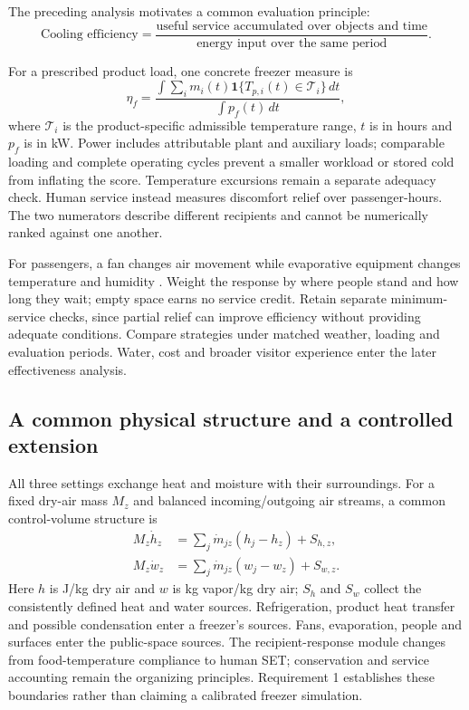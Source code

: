 \documentclass[12pt]{article}
\begin{document}
The preceding analysis motivates a common evaluation principle:
\begin{equation}
\boxed{\text{Cooling efficiency}
=\frac{\text{useful service accumulated over objects and time}}
{\text{energy input over the same period}}.}
\label{eq:principle}
\end{equation}

For a prescribed product load, one concrete freezer measure is
\begin{equation}
 \eta_f=\frac{\int\sum_i m_i(t)\mathbf{1}\{T_{p,i}(t)\in\mathcal T_i\}\,dt}
 {\int p_f(t)\,dt},
\label{eq:freezer-service}
\end{equation}
where $\mathcal T_i$ is the product-specific admissible temperature range, $t$ is in hours and $p_f$ is in kW. Power includes attributable plant and auxiliary loads; comparable loading and complete operating cycles prevent a smaller workload or stored cold from inflating the score. Temperature excursions remain a separate adequacy check. Human service instead measures discomfort relief over passenger-hours. The two numerators describe different recipients and cannot be numerically ranked against one another.

For passengers, a fan changes air movement while evaporative equipment changes temperature and humidity \cite{energystar,evap}. Weight the response by where people stand and how long they wait; empty space earns no service credit. Retain separate minimum-service checks, since partial relief can improve efficiency without providing adequate conditions. Compare strategies under matched weather, loading and evaluation periods. Water, cost and broader visitor experience enter the later effectiveness analysis.

\subsection{A common physical structure and a controlled extension}

All three settings exchange heat and moisture with their surroundings. For a fixed dry-air mass $M_z$ and balanced incoming/outgoing air streams, a common control-volume structure is
\begin{align}
 M_z\dot h_z&=\sum_j\dot m_{jz}(h_j-h_z)+S_{h,z},\\
 M_z\dot w_z&=\sum_j\dot m_{jz}(w_j-w_z)+S_{w,z}.
\label{eq:common-balance}
\end{align}
Here $h$ is J/kg dry air and $w$ is kg vapor/kg dry air; $S_h$ and $S_w$ collect the consistently defined heat and water sources. Refrigeration, product heat transfer and possible condensation enter a freezer's sources. Fans, evaporation, people and surfaces enter the public-space sources. The recipient-response module changes from food-temperature compliance to human SET; conservation and service accounting remain the organizing principles. Requirement 1 establishes these boundaries rather than claiming a calibrated freezer simulation.
\end{document}
